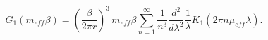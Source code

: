 \begin{equation}
G_{1}\left(m_{eff}\beta \right)=\left(\frac{\beta }{2\pi r}\right)^{3}\, m_{eff}\beta \sum _{n=1}^{\infty }\frac{1}{n^{3}}\frac{d^{2}}{d\lambda ^{2}}\frac{1}{\lambda }K_{1}\left(2\pi n\mu _{eff}\lambda \right).\end{equation}

